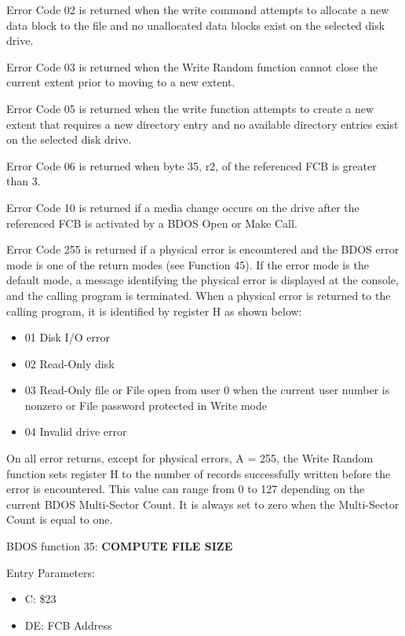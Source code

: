 Error Code 02 is returned when the write command attempts to allocate
a new data block to the file and no unallocated data blocks exist on
the selected disk drive.

Error Code 03 is returned when the Write Random function cannot close
the current extent prior to moving to a new extent.

Error Code 05 is returned when the write function attempts to create a
new extent that requires a new directory entry and no available
directory entries exist on the selected disk drive.

Error Code 06 is returned when byte 35, r2, of the referenced FCB is
greater than 3.

Error Code 10 is returned if a media change occurs on the drive after
the referenced FCB is activated by a BDOS Open or Make Call.

Error Code 255 is returned if a physical error is encountered and the
BDOS error mode is one of the return modes (see Function 45). If the
error mode is the default mode, a message identifying the physical
error is displayed at the console, and the calling program is
terminated. When a physical error is returned to the calling program,
it is identified by register H as shown below:

\begin{itemize}
\item 01 Disk I/O error
\item 02 Read-Only disk

\item 03 Read-Only file or File open from user 0 when the current user
  number is nonzero or File password protected in Write mode

\item 04 Invalid drive error
\end{itemize}

On all error returns, except for physical errors, A = 255, the Write
Random function sets register H to the number of records successfully
written before the error is encountered. This value can range from 0
to 127 depending on the current BDOS Multi-Sector Count. It is always
set to zero when the Multi-Sector Count is equal to one.

BDOS function 35: \textbf{COMPUTE FILE SIZE}

Entry Parameters:
\begin{itemize}
\item[] C: \$23
\item[] DE: FCB Address
\end{itemize}

